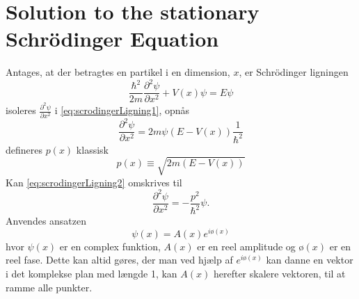 \section{Solution to the stationary Schrödinger Equation}
Antages, at der betragtes en partikel i en dimension, $x$,  er Schrödinger ligningen
\begin{equation}
    \frac{\hbar^2}{2m}\frac{\partial^2 \psi}{\partial x^2} + V(x) \psi = E \psi
    \label{eq:scrodingerLigning1}
\end{equation}
isoleres $\frac{\partial^2 \psi}{\partial x^2}$ i \cref{eq:scrodingerLigning1}, opnås
\begin{equation}
    \frac{\partial^2 \psi}{\partial x^2} = 2m\psi (E  - V(x)) \frac{1}{\hbar^2}
    \label{eq:scrodingerLigning2}
\end{equation}
defineres $p(x)$ klassisk
\begin{equation}
p(x) \equiv \sqrt{2m(E-V(x))}
\end{equation}
Kan \cref{eq:scrodingerLigning2} omskrives til
\begin{equation}
    \frac{\partial^2 \psi}{\partial x^2} = - \frac{p^2}{\hbar^2} \psi.
    \label{eq:scrodingerLigning3}
\end{equation}
Anvendes ansatzen
\begin{equation}
    \psi(x) = A(x) e^{i ø(x)}
    \label{eq:ansatz}
\end{equation}
hvor $\psi (x)$ er en complex funktion, $A(x)$ er en reel amplitude og $ø(x)$ er en reel fase. Dette kan altid gøres, der man ved hjælp af $e^{i ø(x)} $ kan danne en vektor i det komplekse plan med længde 1, kan $A(x)$ herefter skalere vektoren, til at ramme alle punkter. 
